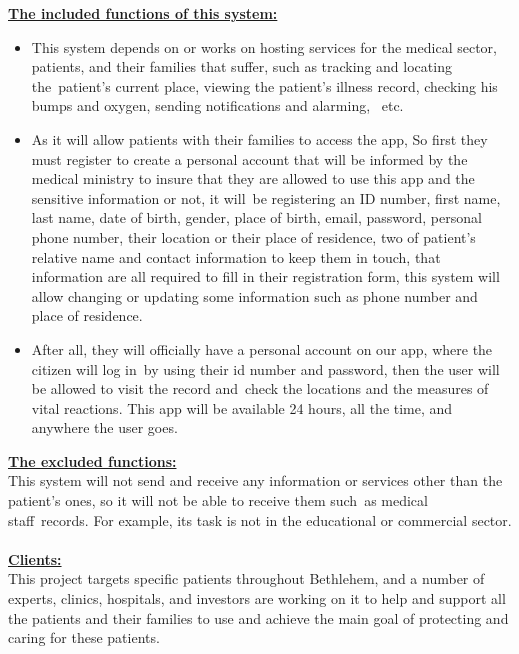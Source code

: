 \documentclass[12pt]{article}
\begin{document}
			
			\textbf{\underline{The included functions of this system: }}\\
			\begin{itemize}
				\item This system depends on or works on hosting services for the medical sector, patients, and their families that suffer, such as tracking and locating the patient's current place, viewing the patient’s illness record, checking his bumps and oxygen, sending notifications and alarming,  etc. 
				\item As it will allow patients with their families to access the app, So first they must register to create a personal account that will be informed by the medical ministry to insure that they are allowed to use this app and the sensitive information or not, it will be registering an ID number, first name, last name, date of birth, gender, place of birth, email, password, personal phone number, their location or their place of residence, two of patient’s relative name and contact information to keep them in touch, that information are all required to fill in their registration form, this system will allow changing or updating some information such as phone number and place of residence. 
				\item After all, they will officially have a personal account on our app, where the citizen will log in by using their id number and password, then the user will be allowed to visit the record and check the locations and the measures of vital reactions. 
				This app will be available 24 hours, all the time, and anywhere the user goes.
			\end{itemize}
		
			\begin{center}
			\end{center}
			\textbf{\underline{The excluded functions:}} \\

			This system will not send and receive any information or services other than the patient’s ones, so it will not be able to receive them such as medical staff records. For example, its task is not in the educational or commercial sector. \\
			\\
			\textbf{\underline{Clients:}}\\
			
			This project targets specific patients throughout Bethlehem, and a number of experts, clinics, hospitals, and investors are working on it to help and support all the patients and their families to use and achieve the main goal of protecting and caring for these patients. 
\end{document}
